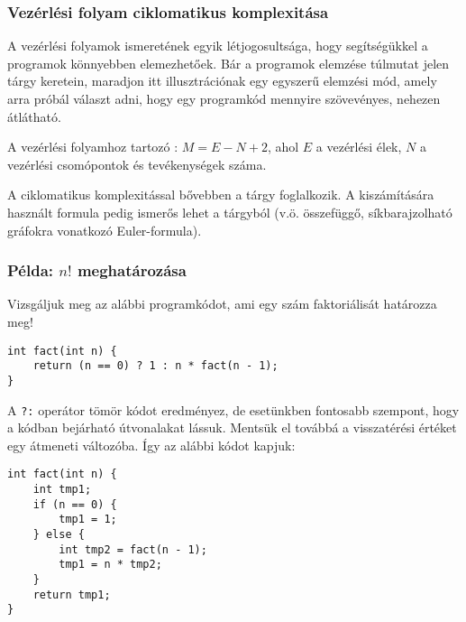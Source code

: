 \subsubsection{Vezérlési folyam ciklomatikus komplexitása}
A vezérlési folyamok ismeretének egyik létjogosultsága, hogy segítségükkel a programok könnyebben elemezhetőek. Bár a programok elemzése túlmutat jelen tárgy keretein, maradjon itt illusztrációnak egy egyszerű elemzési mód, amely arra próbál választ adni, hogy egy programkód mennyire szövevényes, nehezen átlátható. 

\begin{definicio}
A vezérlési folyamhoz tartozó : $M = E - N + 2$, ahol $E$ a vezérlési élek, $N$ a vezérlési csomópontok és tevékenységek száma.
\end{definicio}


\begin{megjegyzes}
	A ciklomatikus komplexitással bővebben a \szofttech tárgy foglalkozik.
	A kiszámítására használt formula pedig ismerős lehet a \bszketto tárgyból (v.ö. összefüggő, síkbarajzolható gráfokra vonatkozó Euler-formula).
\end{megjegyzes}

\subsubsection{Példa: $n!$ meghatározása}

Vizsgáljuk meg az alábbi programkódot, ami egy szám faktoriálisát határozza meg!

\begin{lstlisting}
int fact(int n) {
	return (n == 0) ? 1 : n * fact(n - 1);
}
\end{lstlisting}

A \lstinline{?:} operátor tömör kódot eredményez, de esetünkben fontosabb szempont, hogy a kódban bejárható útvonalakat lássuk. Mentsük el továbbá a visszatérési értéket egy átmeneti változóba. Így az alábbi kódot kapjuk:

\begin{minipage}{\balhasab}
\begin{lstlisting}
int fact(int n) {
	int tmp1;
	if (n == 0) {
		tmp1 = 1;
	} else {
		int tmp2 = fact(n - 1);
		tmp1 = n * tmp2;
	}
	return tmp1;
}
\end{lstlisting}
\end{minipage}
\begin{minipage}{\jobbhasab}
\end{minipage}

